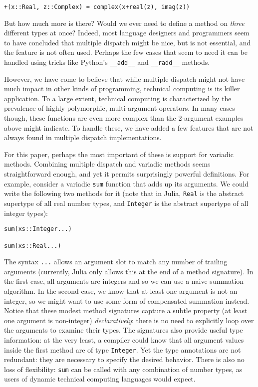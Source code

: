 \documentclass[preprint]{sigplanconf}
\newcommand{\code}[1]{\texttt{#1}}
\begin{document}
\begin{verbatim}
+(x::Real, z::Complex) = complex(x+real(z), imag(z))
\end{verbatim}

But how much more is there? Would we ever need to define a method on
\emph{three} different types at once? Indeed, most language designers and
programmers seem to have concluded that multiple dispatch might be nice, but is
not essential, and the feature is not often used.
Perhaps the few cases that seem to need it can be handled using tricks like
Python's \code{\_\_add\_\_} and \code{\_\_radd\_\_} methods.

However, we have come to believe that while multiple dispatch might not
have much impact in other kinds of programming, technical computing is its
killer application. To a large extent, technical computing is characterized
by the prevalence of highly polymorphic, multi-argument operators. In many
cases though, these functions are even more complex than the 2-argument
examples above might indicate. To handle these, we have added a few
features that are not always found in multiple dispatch implementations.

For this paper, perhaps the most important of these is support for
variadic methods. Combining multiple dispatch and variadic methods
seems straightforward
enough, and yet it permits surprisingly powerful definitions. For example,
consider a variadic \code{sum} function that adds up its arguments. We could
write the following two methods for it (note that in Julia, \code{Real} is
the abstract supertype of all real number types, and \code{Integer} is the
abstract supertype of all integer types):

\begin{verbatim}
sum(xs::Integer...)

sum(xs::Real...)
\end{verbatim}

The syntax \code{...} allows an argument slot to match any number of trailing
arguments (currently, Julia only allows this at the end of a method signature).
In the first case, all arguments are integers and so we can use a naive
summation algorithm. In the second case, we know that at least one argument
is not an integer, so we might want to use some form of compensated
summation instead. Notice that these modest method signatures
capture a subtle property (at least one argument is non-integer)
\emph{declaratively}: there is no need to explicitly loop over the arguments
to examine their types. The signatures also provide useful type information:
at the very least, a compiler could know that all argument values inside
the first method are of type \code{Integer}. Yet the type annotations
are not redundant: they are necessary to specify the desired behavior. There
is also no loss of flexibility: \code{sum} can be called with any combination
of number types, as users of dynamic technical computing languages would expect.
\end{document}
